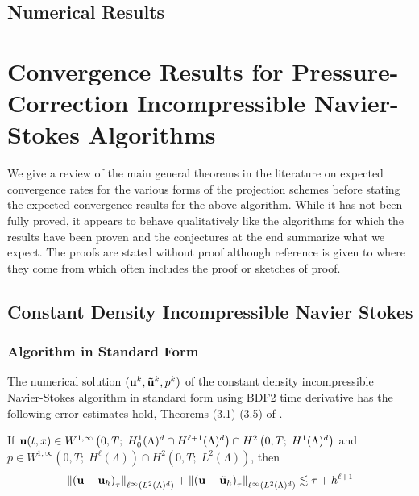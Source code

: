 \documentclass[letterpaper]{erdc}
\begin{document}
%
%
%
\section{Numerical Results}\label{sec:NumericalResults2PFlow}






\appendix


%
%
%
%
\chapter{Convergence Results for Pressure-Correction Incompressible Navier-Stokes Algorithms}\label{ch:LiteratureReview}
We give a review of the main general theorems in the literature on expected convergence rates for the various forms of the projection schemes before stating the expected convergence results for the above algorithm.  While it has not been fully proved, it appears to behave qualitatively like the algorithms for which the results have been proven and the conjectures at the end summarize what we expect.  The proofs are stated without proof although reference is given to where they come from which often includes the proof or sketches of proof.

%
%
%
\section{Constant Density Incompressible Navier Stokes}

%
%
\subsection{Algorithm in Standard Form}
The numerical solution $(\textbf{u}^k, \mathbf{\tilde{u}}^k,p^k)$ of the constant density incompressible Navier-Stokes algorithm in standard form using BDF2 time derivative has the following error estimates hold, Theorems (3.1)-(3.5) of \cite{guermond1997resultat}.

\begin{theorem}\label{thm:guermondthm3.1}
If $\textbf{u}(t,x)\in W^{1,\infty}\left(0,T;\; H_0^1(\Lambda)^d \cap H^{\ell+1}(\Lambda)^d  \right) \cap H^2\left(0,T;\; H^1(\Lambda)^d\right)$ and $p\in W^{1,\infty}\left(0,T;\; H^{\ell}(\Lambda) \right)\cap H^2\left(0,T;\; L^2(\Lambda)\right)$, then
  \begin{equation}
    \left\| \left(\textbf{u} - \textbf{u}_h \right)_{\tau} \right\|_{\ell^{\infty}\left(L^2(\Lambda)^d\right)} + \left\| \left(\textbf{u} - \mathbf{\tilde{u}}_h \right)_{\tau} \right\|_{\ell^{\infty}\left(L^2(\Lambda)^d\right)} \lesssim \tau + h^{\ell+1}
  \end{equation}
\end{theorem}
\end{document}
